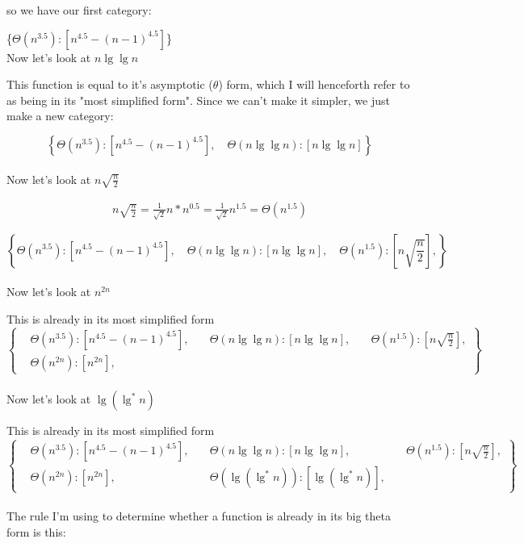 \documentclass[11pt,fleqn]{article}
\theoremstyle{definition}
\theoremstyle{remark}
\begin{document}
so we have our first category:

\{$\Theta(n^{3.5}): [n^{4.5} - (n - 1)^{4.5}]$\}\\

Now let's look at $n \lg \lg n$

This function is equal to it's asymptotic ($\theta$) form, 
which I will henceforth refer to as being in its "most simplified form".
Since we can't make it simpler, we just make a new category:


\[
\left\{
\Theta(n^{3.5}): [n^{4.5} - (n - 1)^{4.5}], 
\quad \Theta(n \lg \lg n): [n \lg \lg n]
\right\}
\]\\

Now let's look at $n\sqrt{\frac{n}{2}}$

\begin{align*}
    n\sqrt{\frac{n}{2}} =
    \frac{1}{\sqrt{2}}n*n^{0.5} = 
    \frac{1}{\sqrt{2}}n^{1.5} = 
    \Theta({n^{1.5}})
\end{align*}


\[
\left\{
\Theta(n^{3.5}): [n^{4.5} - (n - 1)^{4.5}], 
\quad \Theta(n \lg \lg n): [n \lg \lg n],
\quad \Theta(n^{1.5}): [n\sqrt{\frac{n}{2}}],
\right\}
\]\\

Now let's look at $n^{2n}$

This is already in its most simplified form\\

\[
\left\{
\begin{aligned}
& \Theta(n^{3.5}): [n^{4.5} - (n - 1)^{4.5}], 
& \quad \Theta(n \lg \lg n): [n \lg \lg n],
& \quad \Theta(n^{1.5}): [n\sqrt{\frac{n}{2}}],\\
& \Theta(n^{2n}): [n^{2n}],
\end{aligned}
\right\}
\]\\

Now let's look at $\lg(\lg^*n)$

This is already in its most simplified form\\

\[
\left\{
\begin{aligned}
& \Theta(n^{3.5}): [n^{4.5} - (n - 1)^{4.5}], 
& \quad \Theta(n \lg \lg n): [n \lg \lg n],
& \quad \Theta(n^{1.5}): [n\sqrt{\frac{n}{2}}],\\
& \Theta(n^{2n}): [n^{2n}],
& \quad \Theta(\lg(\lg^*n)): [\lg(\lg^*n)],
\end{aligned}
\right\}
\]\\

The rule I'm using to 
determine whether a function is already in its big theta form is 
this:\\
\end{document}
